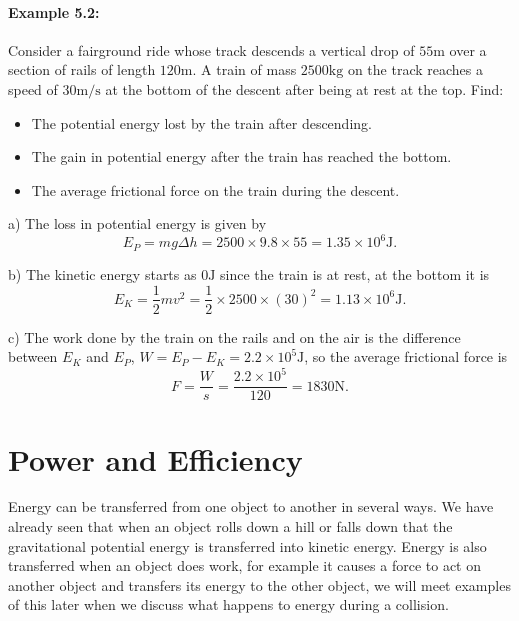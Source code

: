 \paragraph{Example 5.2:} Consider a fairground ride whose track descends a vertical drop of $55\text{m}$ over a section of rails of length $120\text{m}$. A train of mass $2500\text{kg}$ on the track reaches a speed of $30\text{m/s}$ at the bottom of the descent after being at rest at the top. Find:
\begin{itemize}
\setlength{\itemsep}{-5pt}
    \item[a)] The potential energy lost by the train after descending.
    \item[b)] The gain in potential energy after the train has reached the bottom.
    \item[c)] The average frictional force on the train during the descent.
\end{itemize} 
a) The loss in potential energy is given by
\begin{equation*}
E_{P}=mg\Delta h=2500\times 9.8\times 55=1.35\times 10^{6}\text{J}.
\end{equation*}

b) The kinetic energy starts as $0\text{J}$ since the train is at rest, at the bottom it is
\begin{equation*}
E_{K}=\frac{1}{2}mv^{2}=\frac{1}{2}\times 2500\times (30)^{2}=1.13\times 10^{6}\text{J}.
\end{equation*}

c) The work done by the train on the rails and on the air is the difference between $E_{K}$ and $E_{P}$, $W=E_{P}-E_{K}=2.2\times 10^{5}\text{J}$, so the average frictional force is
\begin{equation*}
F=\frac{W}{s}=\frac{2.2\times 10^{5}}{120}=1830\text{N}.
\end{equation*}

\section{Power and Efficiency}
Energy can be transferred from one object to another in several ways. We have already seen that when an object rolls down a hill or falls down that the gravitational potential energy is transferred into kinetic energy. Energy is also transferred when an object does work, for example it causes a force to act on another object and transfers its energy to the other object, we will meet examples of this later when we discuss what happens to energy during a collision.\\

